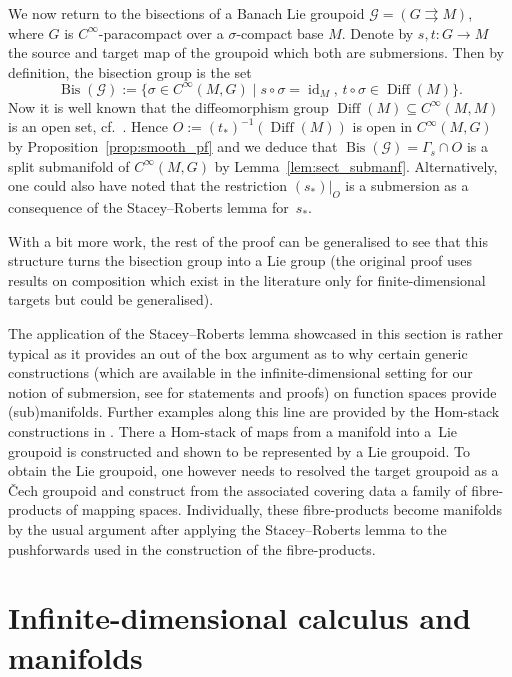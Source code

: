 \documentclass[pdftex]{sigma}
\numberwithin{equation}{section}
\newcommand{\cG}{\ensuremath{\mathcal{G}}}
\newcommand{\Bis}{\ensuremath{\operatorname{Bis}}}
\DeclareMathOperator{\Diff}{Diff}
\DeclareMathOperator{\id}{id}
\begin{document}
We now return to the bisections of a Banach Lie groupoid $\cG = (G \rightrightarrows M)$, where $G$ is $C^\infty$-paracompact over a $\sigma$-compact base $M$. Denote by $s,t \colon G \rightarrow M$ the source and target map of the groupoid which both are submersions. Then by definition, the bisection group is the set
\begin{displaymath}\Bis (\cG) := \{\sigma \in C^\infty (M,G) \mid s \circ \sigma = \id_M,\, t \circ \sigma \in \Diff (M)\}.\end{displaymath}
Now it is well known that the diffeomorphism group $\Diff (M) \subseteq C^\infty (M,M)$ is an open set, cf.~\cite{Mic80}. Hence $O:= (t_\ast)^{-1}(\Diff (M))$ is open in $C^\infty (M,G)$ by Proposition~\ref{prop:smooth_pf} and we deduce that $\Bis(\cG) = \Gamma_s \cap O$ is a split submanifold of $C^\infty (M,G)$ by Lemma~\ref{lem:sect_submanf}. Alternatively, one could also have noted that the restriction $(s_\ast)|_{O}$ is a submersion as a consequence of the Stacey--Roberts lemma for~$s_\ast$.

With a bit more work, the rest of the proof can be generalised to see that this structure turns the bisection group into a Lie group (the original proof uses results on composition which exist in the literature only for finite-dimensional targets but could be generalised).

The application of the Stacey--Roberts lemma showcased in this section is rather typical as it provides an out of the box argument as to why certain generic constructions (which are available in the infinite-dimensional setting for our notion of submersion, see \cite{glo16} for statements and proofs) on function spaces provide (sub)manifolds. Further examples along this line are provided by the Hom-stack constructions in \cite{RaV18,RaV18}. There a Hom-stack of maps from a manifold into a~Lie groupoid is constructed and shown to be represented by a Lie groupoid. To obtain the Lie groupoid, one however needs to resolved the target groupoid as a \v{C}ech groupoid and construct from the associated covering data a family of fibre-products of mapping spaces. Individually, these fibre-products become manifolds by the usual argument after applying the Stacey--Roberts lemma to the pushforwards used in the construction of the fibre-products.

\appendix

\section{Infinite-dimensional calculus and manifolds}\label{App:Bast}
\end{document}
